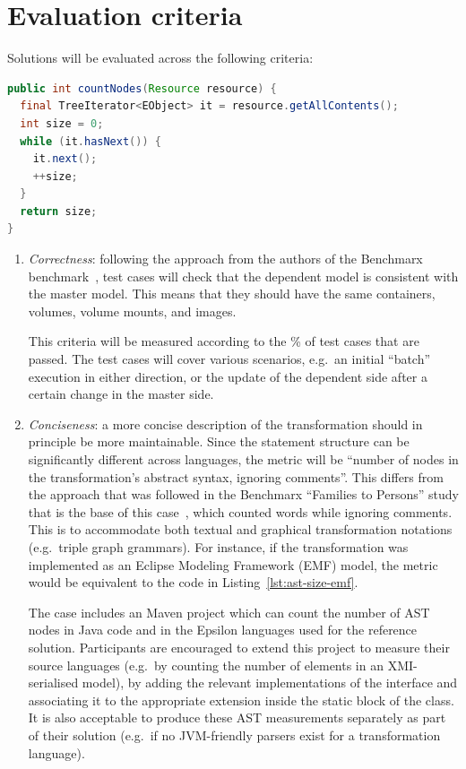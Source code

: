 \documentclass[twocolumn]{ceurart}
\begin{document}
\section{Evaluation criteria}

Solutions will be evaluated across the following criteria:

\begin{lstlisting}[language=Java,float,caption={Sample code for measuring AST/ASG side of transformation rules modelled in EMF},label=lst:ast-size-emf,columns=fullflexible,frame=tb]
public int countNodes(Resource resource) {
  final TreeIterator<EObject> it = resource.getAllContents();
  int size = 0;
  while (it.hasNext()) {
    it.next();
    ++size;
  }
  return size;
}
\end{lstlisting}

\begin{enumerate}
\item \emph{Correctness}: following the approach from the authors of the
  Benchmarx benchmark~\cite{anjorin_benchmarking_2020}, test cases will check
  that the dependent model is consistent with the master model. This means that
  they should have the same containers, volumes, volume mounts, and images.

  This criteria will be measured according to the \% of test cases that are
  passed. The test cases will cover various scenarios, e.g.\ an initial
  ``batch'' execution in either direction, or the update of the dependent side
  after a certain change in the master side.
  
\item \emph{Conciseness}: a more concise description of the transformation
  should in principle be more maintainable. Since the statement structure can be
  significantly different across languages, the metric will be ``number of nodes
  in the transformation's abstract syntax, ignoring comments''. This differs
  from the approach that was followed in the Benchmarx ``Families to Persons''
  study that is the base of this case~\cite{anjorin_families_2017}, which
  counted words while ignoring comments. This is to accommodate both textual and
  graphical transformation notations (e.g.\ triple graph grammars). For
  instance, if the transformation was implemented as an Eclipse Modeling
  Framework (EMF) model, the metric would be equivalent to the code in
  Listing~\ref{lst:ast-size-emf}.

  The case includes an  Maven project which can count the
  number of AST nodes in Java code and in the Epsilon languages used for the
  reference solution. Participants are encouraged to extend this project to
  measure their source languages (e.g.\ by counting the number of elements in an
  XMI-serialised model), by adding the relevant implementations of the
   interface and associating it to the appropriate
  extension inside the static block of the  class. It
  is also acceptable to produce these AST measurements separately as part of
  their solution (e.g.\ if no JVM-friendly parsers exist for a transformation
  language).


\end{enumerate}
\end{document}
